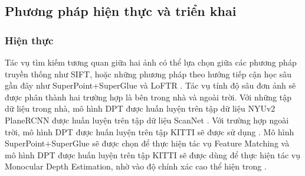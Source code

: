 \subsection{Phương pháp hiện thực và triển khai}
\subsubsection{Hiện thực}
Tác vụ tìm kiếm tương quan giữa hai ảnh có thể lựa chọn giữa các phương pháp truyền thống như SIFT, hoặc những phương pháp theo hướng tiếp cận học sâu gần đây như SuperPoint+SuperGlue \cite{sarlin2020superglue} và LoFTR \cite{sun2021loftr}. Tác vụ tính độ sâu đơn ảnh sẽ được phân thành hai trường hợp là bên trong nhà và ngoài trời. Với những tập dữ liệu trong nhà, mô hình DPT \cite{ranftl2021vision} được huấn luyện trên tập dữ liệu NYUv2 \cite{silberman2012indoor} PlaneRCNN \cite{liu2019planercnn} được huấn luyện trên tập dữ liệu ScanNet \cite{dai2017scannet}. Với trường hợp ngoài trời, mô hình DPT \cite{ranftl2021vision} được huấn luyện trên tập KITTI sẽ được sử dụng \cite{geiger2012we}. Mô hình SuperPoint+SuperGlue sẽ được chọn để thực hiện tác vụ Feature Matching và mô hình DPT được huấn luyện trên tập KITTI sẽ được dùng để thực hiện tác vụ Monocular Depth Estimation, nhờ vào độ chính xác cao thể hiện trong \cite{arnold2022mapfree}.

